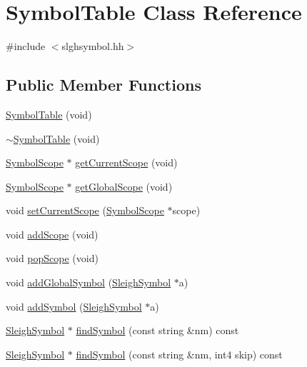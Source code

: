 \hypertarget{class_symbol_table}{}\section{Symbol\+Table Class Reference}
\label{class_symbol_table}


{\ttfamily \#include $<$slghsymbol.\+hh$>$}

\subsection*{Public Member Functions}
\begin{DoxyCompactItemize}
\item 
\mbox{\hyperlink{class_symbol_table_ab291d6d0a49c3dc33969f2852b7fe9ce}{Symbol\+Table}} (void)
\item 
\mbox{\hyperlink{class_symbol_table_a73e3a36a768a5799bd8ea83449f26ecb}{$\sim$\+Symbol\+Table}} (void)
\item 
\mbox{\hyperlink{class_symbol_scope}{Symbol\+Scope}} $\ast$ \mbox{\hyperlink{class_symbol_table_ab0831c894cb828ab8e7b307ec82a0772}{get\+Current\+Scope}} (void)
\item 
\mbox{\hyperlink{class_symbol_scope}{Symbol\+Scope}} $\ast$ \mbox{\hyperlink{class_symbol_table_a66d6512a45da8f2fc3d12b2d0993b9c9}{get\+Global\+Scope}} (void)
\item 
void \mbox{\hyperlink{class_symbol_table_addcd839d5b960ec9e76d661c6896b742}{set\+Current\+Scope}} (\mbox{\hyperlink{class_symbol_scope}{Symbol\+Scope}} $\ast$scope)
\item 
void \mbox{\hyperlink{class_symbol_table_a6fedbdf936a8d9d5026fdcfa781aed36}{add\+Scope}} (void)
\item 
void \mbox{\hyperlink{class_symbol_table_a66df4cebfc5231736341e3d2845dc298}{pop\+Scope}} (void)
\item 
void \mbox{\hyperlink{class_symbol_table_a89ba2f534939813435049b947d9dae30}{add\+Global\+Symbol}} (\mbox{\hyperlink{class_sleigh_symbol}{Sleigh\+Symbol}} $\ast$a)
\item 
void \mbox{\hyperlink{class_symbol_table_a2555ddfe5e531fa48bb0aaca7e59501d}{add\+Symbol}} (\mbox{\hyperlink{class_sleigh_symbol}{Sleigh\+Symbol}} $\ast$a)
\item 
\mbox{\hyperlink{class_sleigh_symbol}{Sleigh\+Symbol}} $\ast$ \mbox{\hyperlink{class_symbol_table_ad9979f9aa4a6588bbf016182c472b40b}{find\+Symbol}} (const string \&nm) const
\item 
\mbox{\hyperlink{class_sleigh_symbol}{Sleigh\+Symbol}} $\ast$ \mbox{\hyperlink{class_symbol_table_af9e38cf4a6423e179b08d1fc74a85d39}{find\+Symbol}} (const string \&nm, int4 skip) const

\end{DoxyCompactItemize}
